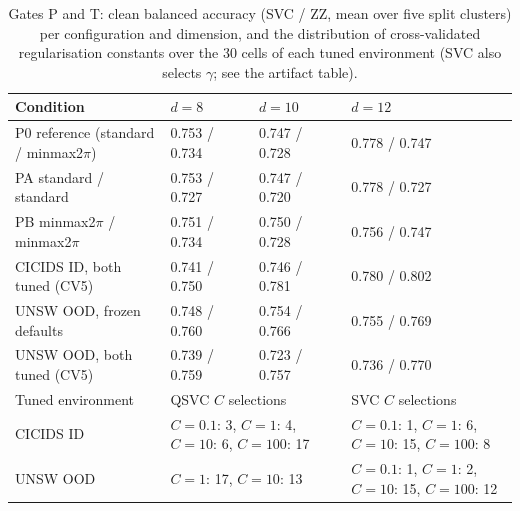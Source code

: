 \begin{table}[!t]
\caption{Gates P and T: clean balanced accuracy (SVC / ZZ, mean over five split clusters) per configuration and dimension, and the distribution of cross-validated regularisation constants over the 30 cells of each tuned environment (SVC also selects $\gamma$; see the artifact table).}
\label{tab:s-clean}
\centering
\scriptsize
\setlength{\tabcolsep}{3pt}
\begin{tabular}{@{}llll@{}}
\toprule
Condition & $d=8$ & $d=10$ & $d=12$ \\
\midrule
P0 reference (standard / minmax2$\pi$) & 0.753 / 0.734 & 0.747 / 0.728 & 0.778 / 0.747 \\
PA standard / standard & 0.753 / 0.727 & 0.747 / 0.720 & 0.778 / 0.727 \\
PB minmax2$\pi$ / minmax2$\pi$ & 0.751 / 0.734 & 0.750 / 0.728 & 0.756 / 0.747 \\
CICIDS ID, both tuned (CV5) & 0.741 / 0.750 & 0.746 / 0.781 & 0.780 / 0.802 \\
UNSW OOD, frozen defaults & 0.748 / 0.760 & 0.754 / 0.766 & 0.755 / 0.769 \\
UNSW OOD, both tuned (CV5) & 0.739 / 0.759 & 0.723 / 0.757 & 0.736 / 0.770 \\
\midrule
Tuned environment & \multicolumn{2}{l}{QSVC $C$ selections} & SVC $C$ selections \\
\midrule
CICIDS ID & \multicolumn{2}{l}{$C=0.1$: 3, $C=1$: 4, $C=10$: 6, $C=100$: 17} & $C=0.1$: 1, $C=1$: 6, $C=10$: 15, $C=100$: 8 \\
UNSW OOD & \multicolumn{2}{l}{$C=1$: 17, $C=10$: 13} & $C=0.1$: 1, $C=1$: 2, $C=10$: 15, $C=100$: 12 \\
\bottomrule
\end{tabular}
\end{table}
